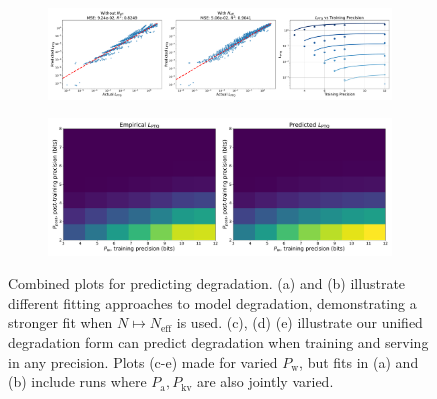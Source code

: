 \documentclass[11pt]{article}
\begin{document}
\begin{figure}
    \centering
    \begin{subfigure}[b]{\linewidth}
        \centering
        \includegraphics[width=\linewidth]{combined_plots_top_new_evals.pdf} %
    \end{subfigure}
    
    \vspace{1em} %
    \begin{subfigure}[b]{\linewidth}
        \centering
        \includegraphics[width=0.66\linewidth]{combined_plots_bottom_new_evals.pdf} %
    \end{subfigure}

    \caption{Combined plots for predicting degradation. (a) and (b) illustrate different fitting approaches to model degradation, demonstrating a stronger fit when $N \mapsto N_\text{eff}$ is used. (c), (d) (e) illustrate our unified degradation form can predict degradation when training and serving in any precision. Plots (c-e) made for varied $P_\text{w}$, but fits in (a) and (b) include runs where $P_\text{a}, P_\text{kv}$ are also jointly varied. 
    }
    \label{fig:ptq-tax-unifying}
\end{figure}
\end{document}
